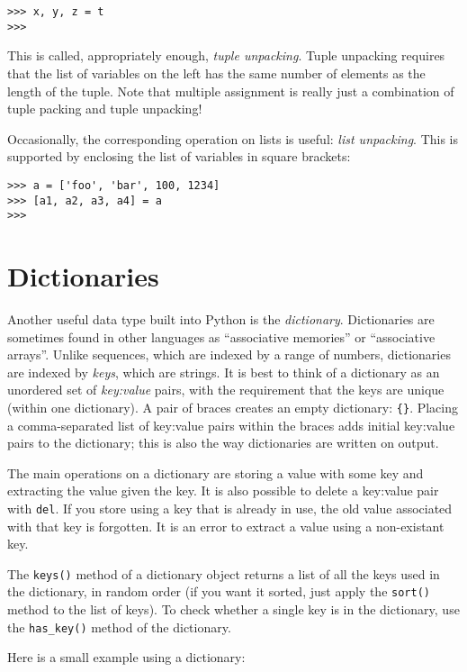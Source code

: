 \bcode\begin{verbatim}
>>> x, y, z = t
>>>
\end{verbatim}\ecode
%
This is called, appropriately enough, {\em tuple unpacking}.  Tuple
unpacking requires that the list of variables on the left has the same
number of elements as the length of the tuple.  Note that multiple
assignment is really just a combination of tuple packing and tuple
unpacking!

Occasionally, the corresponding operation on lists is useful: {\em list
unpacking}.  This is supported by enclosing the list of variables in
square brackets:

\bcode\begin{verbatim}
>>> a = ['foo', 'bar', 100, 1234]
>>> [a1, a2, a3, a4] = a
>>>
\end{verbatim}\ecode

\section{Dictionaries}

Another useful data type built into Python is the {\em dictionary}.
Dictionaries are sometimes found in other languages as ``associative
memories'' or ``associative arrays''.  Unlike sequences, which are
indexed by a range of numbers, dictionaries are indexed by {\em keys},
which are strings.  It is best to think of a dictionary as an unordered set of
{\em key:value} pairs, with the requirement that the keys are unique
(within one dictionary).
A pair of braces creates an empty dictionary: \verb/{}/.
Placing a comma-separated list of key:value pairs within the
braces adds initial key:value pairs to the dictionary; this is also the
way dictionaries are written on output.

The main operations on a dictionary are storing a value with some key
and extracting the value given the key.  It is also possible to delete
a key:value pair
with {\tt del}.
If you store using a key that is already in use, the old value
associated with that key is forgotten.  It is an error to extract a
value using a non-existant key.

The {\tt keys()} method of a dictionary object returns a list of all the
keys used in the dictionary, in random order (if you want it sorted,
just apply the {\tt sort()} method to the list of keys).  To check
whether a single key is in the dictionary, use the \verb/has_key()/
method of the dictionary.

Here is a small example using a dictionary:

